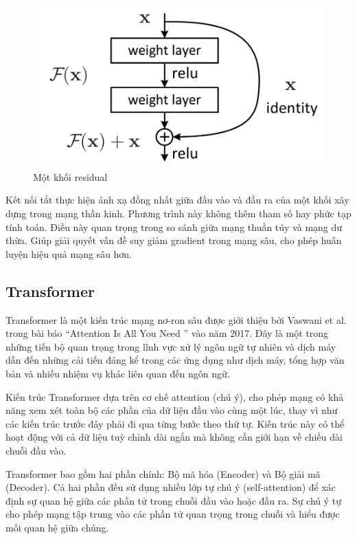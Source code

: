 \begin{figure}[h]
    \includegraphics[scale=0.3]{chapter2/images/residual_block.png}
    \centering
    \caption{Một khối residual}
    \label{residual-block}
\end{figure}

Kết nối tắt thực hiện ánh xạ đồng nhất giữa đầu vào và đầu ra của một khối xây dựng trong mạng thần kinh. Phương trình này không thêm tham số hay phức tạp tính toán. Điều này quan trọng trong so sánh giữa mạng thuần túy và mạng dư thừa. Giúp giải quyết vấn đề suy giảm gradient trong mạng sâu, cho phép huấn luyện hiệu quả mạng sâu hơn.

\subsection{Transformer}
Transformer là một kiến trúc mạng nơ-ron sâu được giới thiệu bởi Vaswani et al. trong bài báo ``Attention Is All You Need \cite{vaswani2023attention}'' vào năm 2017. Đây là một trong những tiến bộ quan trọng trong lĩnh vực xử lý ngôn ngữ tự nhiên và dịch máy dẫn đến những cải tiến đáng kể trong các ứng dụng như dịch máy, tổng hợp văn bản và nhiều nhiệm vụ khác liên quan đến ngôn ngữ.

Kiến trúc Transformer dựa trên cơ chế attention (chú ý), cho phép mạng có khả năng xem xét toàn bộ các phần của dữ liệu đầu vào cùng một lúc, thay vì như các kiến trúc trước đây phải đi qua từng bước theo thứ tự. Kiến trúc này có thể hoạt động với cả dữ liệu tuỳ chỉnh dài ngắn mà không cần giới hạn về chiều dài chuỗi đầu vào.

Transformer bao gồm hai phần chính: Bộ mã hóa (Encoder) và Bộ giải mã (Decoder). Cả hai phần đều sử dụng nhiều lớp tự chú ý (self-attention) để xác định sự quan hệ giữa các phần tử trong chuỗi đầu vào hoặc đầu ra. Sự chú ý tự cho phép mạng tập trung vào các phần tử quan trọng trong chuỗi và hiểu được mối quan hệ giữa chúng.

